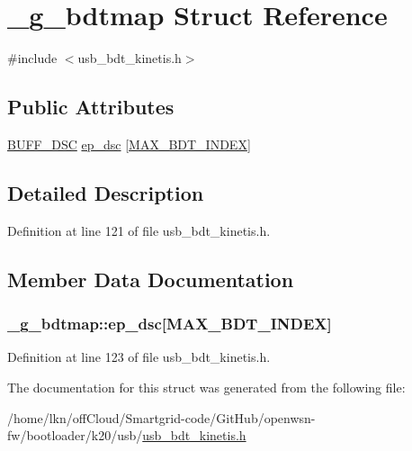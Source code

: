\hypertarget{struct__g__bdtmap}{}\section{\+\_\+g\+\_\+bdtmap Struct Reference}
\label{struct__g__bdtmap}


{\ttfamily \#include $<$usb\+\_\+bdt\+\_\+kinetis.\+h$>$}

\subsection*{Public Attributes}
\begin{DoxyCompactItemize}
\item 
\hyperlink{usb__bdt__kinetis_8h_a371052f530da91400360a8a9209ad9b8}{B\+U\+F\+F\+\_\+\+D\+SC} \hyperlink{struct__g__bdtmap_a3246889fdac53aec48adf1629e664464}{ep\+\_\+dsc} \mbox{[}\hyperlink{usb__bdt__kinetis_8h_a9e5beabc70e1b9bfebf53ffff12f771a}{M\+A\+X\+\_\+\+B\+D\+T\+\_\+\+I\+N\+D\+EX}\mbox{]}
\end{DoxyCompactItemize}


\subsection{Detailed Description}


Definition at line 121 of file usb\+\_\+bdt\+\_\+kinetis.\+h.



\subsection{Member Data Documentation}
\subsubsection[{\texorpdfstring{ep\+\_\+dsc}{ep_dsc}}]{ \+\_\+g\+\_\+bdtmap\+::ep\+\_\+dsc\mbox{[}{\bf M\+A\+X\+\_\+\+B\+D\+T\+\_\+\+I\+N\+D\+EX}\mbox{]}}\hypertarget{struct__g__bdtmap_a3246889fdac53aec48adf1629e664464}{}\label{struct__g__bdtmap_a3246889fdac53aec48adf1629e664464}


Definition at line 123 of file usb\+\_\+bdt\+\_\+kinetis.\+h.



The documentation for this struct was generated from the following file\+:\begin{DoxyCompactItemize}
\item 
/home/lkn/off\+Cloud/\+Smartgrid-\/code/\+Git\+Hub/openwsn-\/fw/bootloader/k20/usb/\hyperlink{usb__bdt__kinetis_8h}{usb\+\_\+bdt\+\_\+kinetis.\+h}\end{DoxyCompactItemize}
